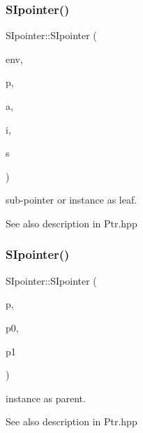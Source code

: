 \subsubsection{\texorpdfstring{SIpointer()}{SIpointer()}\hspace{0.1cm}{\footnotesize\ttfamily [4/6]}}
{\footnotesize\ttfamily S\+Ipointer\+::\+S\+Ipointer (\begin{DoxyParamCaption}\item[{\mbox{\hyperlink{classEnvironment}{Environment}} $\ast$}]{env,  }\item[{const \mbox{\hyperlink{classSIpointer}{S\+Ipointer}} \&}]{p,  }\item[{size\+\_\+t}]{a,  }\item[{size\+\_\+t}]{i,  }\item[{state\+\_\+t}]{s }\end{DoxyParamCaption})}



sub-\/pointer or instance as leaf. 

\begin{DoxySeeAlso}{See also}
description in Ptr.\+hpp 
\end{DoxySeeAlso}
\mbox{\label{group__table_ga175406f6e30433d90a004aa27c401f29}} 
\subsubsection{\texorpdfstring{SIpointer()}{SIpointer()}\hspace{0.1cm}{\footnotesize\ttfamily [5/6]}}
{\footnotesize\ttfamily S\+Ipointer\+::\+S\+Ipointer (\begin{DoxyParamCaption}\item[{const \mbox{\hyperlink{classSIpointer}{S\+Ipointer}} \&}]{p,  }\item[{const \mbox{\hyperlink{classSIpointer}{S\+Ipointer}} \&}]{p0,  }\item[{const \mbox{\hyperlink{classSIpointer}{S\+Ipointer}} \&}]{p1 }\end{DoxyParamCaption})}



instance as parent. 

\begin{DoxySeeAlso}{See also}
description in Ptr.\+hpp 
\end{DoxySeeAlso}
\mbox{\label{group__table_ga19a6965aca9363f90f45c5d0e07bc99e}} 
